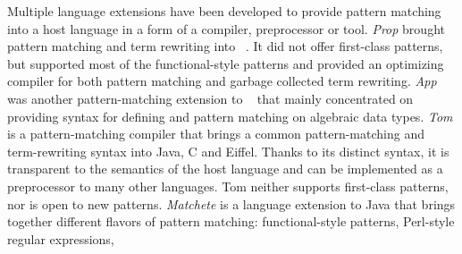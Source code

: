 Multiple language extensions have been developed to provide pattern matching into 
a host language in a form of a compiler, preprocessor or tool.
%
\emph{Prop} %
brought pattern matching and term 
rewriting into \Cpp{}~\cite{Prop96}. %
It did not offer 
first-class patterns, but supported most of the functional-style patterns and 
provided an optimizing compiler for both pattern matching and garbage collected 
term rewriting. \emph{App} was another pattern-matching extension to \Cpp{}~\cite{App} 
that mainly concentrated on providing syntax for defining and pattern matching on algebraic data types. 
%
\emph{Tom} is a pattern-matching compiler that %
brings a common 
pattern-matching and term-rewriting syntax into Java, C and Eiffel. %
Thanks to its distinct syntax, it is transparent to the semantics of the host language 
and can be implemented as a preprocessor to many other languages. %
Tom neither supports first-class patterns, nor is open to new patterns. 
%
\emph{Matchete} is a language extension to Java that brings together different flavors 
of pattern matching: functional-style patterns, Perl-style regular expressions, 
